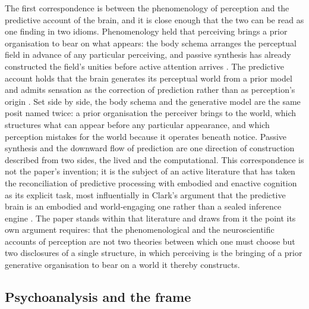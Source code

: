 The first correspondence is between the phenomenology of perception and the predictive account of the brain, and it is close enough that the two can be read as one finding in two idioms. Phenomenology held that perceiving brings a prior organisation to bear on what appears: the body schema arranges the perceptual field in advance of any particular perceiving, and passive synthesis has already constructed the field's unities before active attention arrives \parencite{merleau-ponty1962,husserl2001}. The predictive account holds that the brain generates its perceptual world from a prior model and admits sensation as the correction of prediction rather than as perception's origin \parencite{friston2010}. Set side by side, the body schema and the generative model are the same posit named twice: a prior organisation the perceiver brings to the world, which structures what can appear before any particular appearance, and which perception mistakes for the world because it operates beneath notice. Passive synthesis and the downward flow of prediction are one direction of construction described from two sides, the lived and the computational. This correspondence is not the paper's invention; it is the subject of an active literature that has taken the reconciliation of predictive processing with embodied and enactive cognition as its explicit task, most influentially in Clark's argument that the predictive brain is an embodied and world-engaging one rather than a sealed inference engine \parencite{clark2013,clark2016}. The paper stands within that literature and draws from it the point its own argument requires: that the phenomenological and the neuroscientific accounts of perception are not two theories between which one must choose but two disclosures of a single structure, in which perceiving is the bringing of a prior generative organisation to bear on a world it thereby constructs.

\subsection{Psychoanalysis and the frame}
\label{p23:sub:conv-psychoanalysis}

